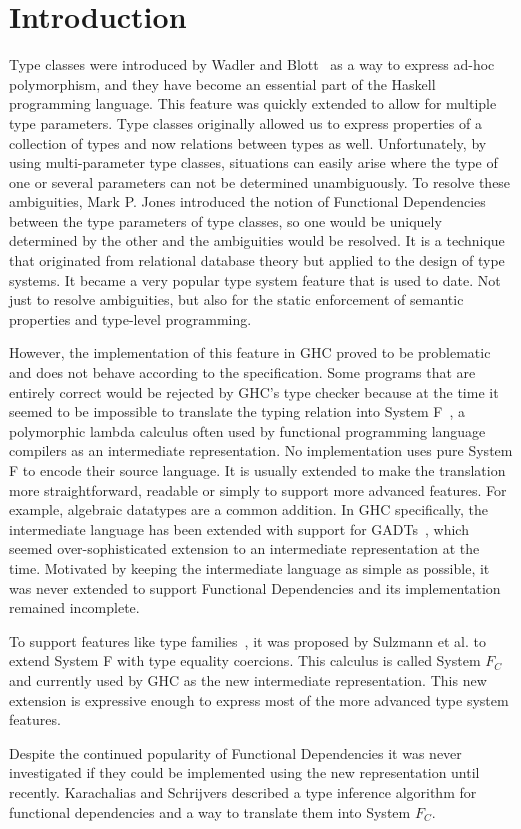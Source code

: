 \section{Introduction}
Type classes were introduced by Wadler and Blott~\cite{Wadler:1989:MAP:75277.75283}
as a
way to express ad-hoc polymorphism, and they have become an essential part of the Haskell
programming language. This feature was quickly extended to allow for multiple
type parameters. Type classes originally allowed us to express properties of a
collection of types and now relations between types as well. Unfortunately, by using
multi-parameter type classes, situations can easily arise where the type
of one or several parameters can not be determined unambiguously. To resolve
these ambiguities, Mark P. Jones introduced the notion of Functional Dependencies
\cite{Jones00typeclasses} between the type parameters of type classes, so one
would be uniquely determined by the other and the ambiguities would be resolved.
It is a technique that originated from relational database theory but applied to
the design of type systems. It became a very popular type system feature that is
used to date. Not just to resolve ambiguities, but also for the
static enforcement of semantic properties and type-level programming.

However, the implementation of this feature in GHC proved to be problematic and
does not behave according to the specification.  Some programs that are entirely
correct
would be rejected by GHC's type checker because at the time it seemed to be
impossible to translate the typing relation into System
F~\cite{systemf},
a polymorphic
lambda calculus often used by functional programming language compilers as an
intermediate representation. No implementation uses pure System F to encode
their source language. It is usually extended to make the translation more
straightforward, readable or simply to support more advanced features. For
example, algebraic datatypes are a common addition. In GHC specifically, the intermediate language has been extended
with support for GADTs~\cite{PeytonJones06}, which seemed over-sophisticated extension to an
intermediate representation at the time. Motivated by
keeping the intermediate language as simple as possible, it was never extended
to support Functional Dependencies and its implementation remained incomplete.

To support features like type
families~\cite{AssociatedTypeSynonyms}, it was proposed by
Sulzmann et al. \cite{Sulzmann:2007:SFT:1190315.1190324} to extend System F with
type equality coercions. This calculus is called System $F_C$ and currently used by
GHC as the new intermediate representation. This new extension is expressive
enough to express most of the more advanced type system features.

Despite the continued popularity of Functional Dependencies it was never
investigated if they could be implemented using the new representation until
recently. Karachalias and Schrijvers \cite{Karachalias:2017:EFD:3156695.3122966}
described a type inference algorithm for functional dependencies and a way to
translate them into System $F_C$.
